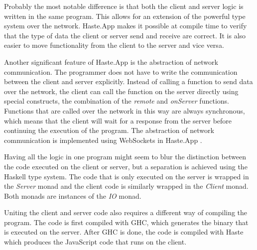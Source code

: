 \documentclass[a4paper]{article}
\begin{document}
Probably the most notable difference is that both the client and server logic is written in the same program. This allows for an extension of the powerful type system over the network. Haste.App makes it possible at compile time to verify that the type of data the client or server send and receive are correct. It is also easier to move functionality from the client to the server and vice versa.

Another significant feature of Haste.App is the abstraction of network communication. The programmer does not have to write the communication between the client and server explicitly. Instead of calling a function to send data over the network, the client can call the function on the server directly using special constructs, the combination of the \textit{remote} and \textit{onServer} functions. Functions that are called over the network in this way are always synchronous, which means that the client will wait for a response from the server before continuing the execution of the program. The abstraction of network communication is implemented using WebSockets in Haste.App \cite{a-distributed-haskell-for-the-modern-web}.

Having all the logic in one program might seem to blur the distinction between the code executed on the client or server, but a separation is achieved using the Haskell type system. The code that is only executed on the server is wrapped in the \textit{Server} monad and the client code is similarly wrapped in the \textit{Client} monad. Both monads are instances of the \textit{IO} monad. %

Uniting the client and server code also requires a different way of compiling the program. The code is first compiled with GHC, which generates the binary that is executed on the server. After GHC is done, the code is compiled with Haste which produces the JavaScript code that runs on the client. 
\end{document}
